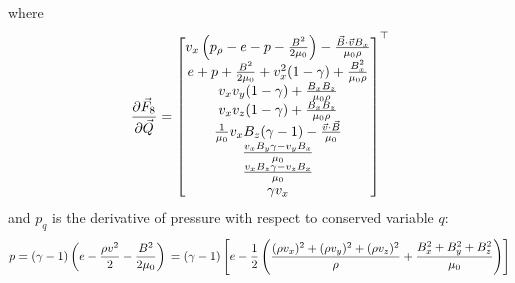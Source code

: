 \documentclass[10pt,letterpaper,notitlepage]{report}
\begin{document}
where 
\begin{equation}
\pdv{\vec F_8}{\vec Q} = 
\begin{bmatrix}
v_x \left(p_\rho - e - p - \frac{B^2}{2 \mu_0}\right) - \frac{\vec B \cdot \vec v B_x}{\mu_0 \rho} \\
e + p + \frac{B^2}{2 \mu_0} + v_x ^2 (1 - \gamma) + \frac{B_x ^2}{\mu_0 \rho} \\
v_x v_y (1 - \gamma) + \frac{B_x B_z}{\mu_0 \rho} \\
v_x v_z (1 - \gamma) + \frac{B_x B_z}{\mu_0 \rho} \\
\frac{1}{\mu_0} v_x B_z (\gamma - 1) - \frac{\vec v \cdot \vec B}{\mu_0} \\
\frac{v_x B_y \gamma - v_y B_x}{\mu_0} \\
\frac{v_x B_z \gamma - v_z B_x}{\mu_0} \\
\gamma v_x
\end{bmatrix}^\top
\end{equation}
and $p_q$ is the derivative of pressure with respect to conserved variable $q$:
\begin{equation}
p = (\gamma - 1) \left(e - \frac{\rho v^2}{2} - \frac{B^2}{2 \mu_0} \right) \\
= (\gamma - 1) \left[ e - \frac{1}{2} \left( \frac{(\rho v_x)^2 + (\rho v_y)^2 + (\rho v_z)^2}{\rho} + \frac{B_x ^2 + B_y ^2 + B_z ^2}{\mu_0} \right) \right]
\end{equation}
\end{document}
